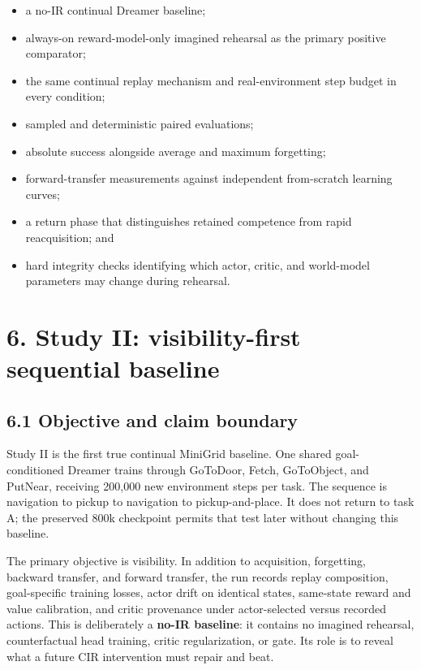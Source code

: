 \documentclass[10pt,a4paper]{article}
\newcommand{\reportsection}[1]{\section{#1}}
\newcommand{\reportsubsection}[1]{\subsection{\textcolor{brandblue}{#1}}}
\begin{document}
\begin{itemize}
\item a no-IR continual Dreamer baseline;
\item always-on reward-model-only imagined rehearsal as the primary positive comparator;
\item the same continual replay mechanism and real-environment step budget in every condition;
\item sampled and deterministic paired evaluations;
\item absolute success alongside average and maximum forgetting;
\item forward-transfer measurements against independent from-scratch learning curves;
\item a return phase that distinguishes retained competence from rapid reacquisition; and
\item hard integrity checks identifying which actor, critic, and world-model parameters may change during rehearsal.
\end{itemize}
\begin{center}
\end{center}
\reportsection{6. Study II: visibility-first sequential baseline}
\reportsubsection{6.1 Objective and claim boundary}
Study II is the first true continual MiniGrid baseline. One shared goal-conditioned Dreamer trains through GoToDoor, Fetch, GoToObject, and PutNear, receiving 200,000 new environment steps per task. The sequence is navigation to pickup to navigation to pickup-and-place. It does not return to task A; the preserved 800k checkpoint permits that test later without changing this baseline.

The primary objective is visibility. In addition to acquisition, forgetting, backward transfer, and forward transfer, the run records replay composition, goal-specific training losses, actor drift on identical states, same-state reward and value calibration, and critic provenance under actor-selected versus recorded actions. This is deliberately a \textbf{no-IR baseline}: it contains no imagined rehearsal, counterfactual head training, critic regularization, or gate. Its role is to reveal what a future CIR intervention must repair and beat.
\end{document}
